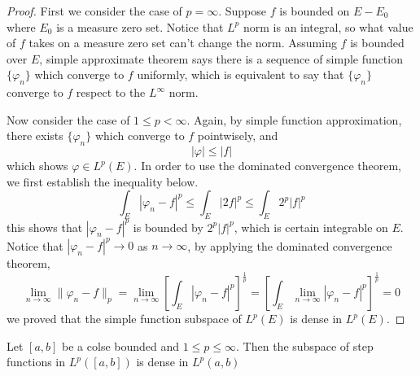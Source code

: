 \documentclass[lang=en, 12pt]{elegantbook}
\begin{document}
        \begin{proof}
            First we consider the case of $p= \infty$. Suppose $f$ is bounded on $E-E_0$ where 
        $E_0$ is a measure zero set. Notice that $L^p$ norm is an integral, so what value of $f$
        takes on a measure zero set can't change the norm. Assuming $f$ is bounded over $E$,
        simple approximate theorem says there is a sequence of simple function $\{\varphi_n\}$
        which converge to $f$ uniformly, which is equivalent to say that $\{\varphi_n\}$
        converge to $f$ respect to the $L^{\infty}$ norm. \par 
            Now consider the case of $1\leq p < \infty$. Again, by simple function approximation,
        there exists $\{\varphi_n\}$ which converge to $f$ pointwisely, and 
        $$|\varphi| \leq |f|$$ 
        which shows $\varphi \in L^p(E)$. In order to use the dominated convergence theorem,
        we first establish the inequality below.
        $$\int_E |\varphi_n - f|^p \leq \int_E |2f|^p \leq \int _E 2^p|f|^p$$ 
        this shows that $|\varphi_n - f|^p$ is bounded by $2^p|f|^p$, which is certain 
        integrable on $E$. Notice that $|\varphi_n - f|^p \to 0$ as $n \to \infty$,
        by applying the dominated convergence theorem,
        $$\lim_{n \to \infty}\lVert \varphi_n -f \rVert_p 
        = \lim_{n \to \infty} [\int_E |\varphi_n - f|^p]^{\frac{1}{p}} = 
        [\int_E \lim_{n \to \infty}|\varphi_n - f|^p]^{\frac{1}{p}} = 0 $$
        we proved that the simple function subspace of 
        $L^p(E)$ is dense in $L^p(E)$.
        \end{proof}
        \begin{proposition}
            Let $[a,b]$ be a colse bounded and $1\leq p\leq \infty$. Then the subspace of step functions
        in $L^p([a,b])$ is dense in $L^p(a,b)$
        \end{proposition}
\end{document}
